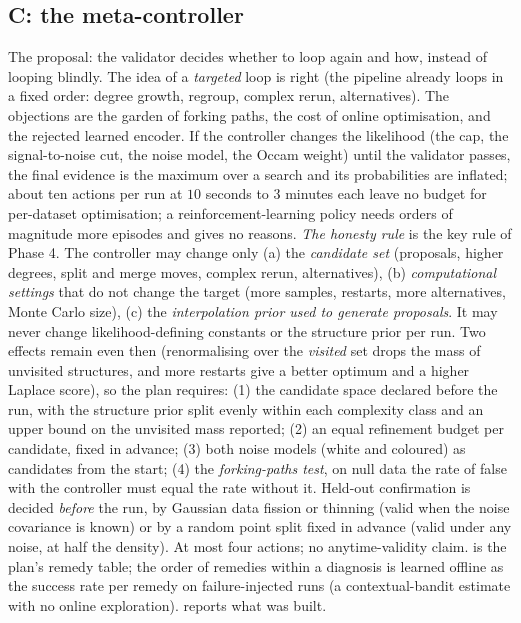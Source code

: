 \subsection{C: the meta-controller}
The proposal: the validator decides whether to loop again and how, instead of looping blindly. The idea of a \emph{targeted} loop is right (the pipeline already loops in a fixed order: degree growth, regroup, complex rerun, alternatives). The objections are the garden of forking paths, the cost of online optimisation, and the rejected learned encoder.
If the controller changes the likelihood (the cap, the signal-to-noise cut, the noise model, the Occam weight) until the validator passes, the final evidence is the maximum over a search and its probabilities are inflated; about ten actions per run at $10$ seconds to $3$ minutes each leave no budget for per-dataset optimisation; a reinforcement-learning policy needs orders of magnitude more episodes and gives no reasons.
\emph{The honesty rule} is the key rule of Phase 4. The controller may change only (a) the \emph{candidate set} (proposals, higher degrees, split and merge moves, complex rerun, alternatives), (b) \emph{computational settings} that do not change the target (more samples, restarts, more alternatives, Monte Carlo size), (c) the \emph{interpolation prior used to generate proposals}.
It may never change likelihood-defining constants or the structure prior per run. Two effects remain even then (renormalising over the \emph{visited} set drops the mass of unvisited structures, and more restarts give a better optimum and a higher Laplace score), so the plan requires: (1) the candidate space declared before the run, with the structure prior split evenly within each complexity class and an upper bound on the unvisited mass reported;
(2) an equal refinement budget per candidate, fixed in advance; (3) both noise models (white and coloured) as candidates from the start; (4) the \emph{forking-paths test}, on null data the rate of false \FC{} with the controller must equal the rate without it. Held-out confirmation is decided \emph{before} the run, by Gaussian data fission or thinning (valid when the noise covariance is known) or by a random point split fixed in advance (valid under any noise, at half the density). At most four actions; no anytime-validity claim.
 is the plan's remedy table; the order of remedies within a diagnosis is learned offline as the success rate per remedy on failure-injected runs (a contextual-bandit estimate with no online exploration).  reports what was built.

